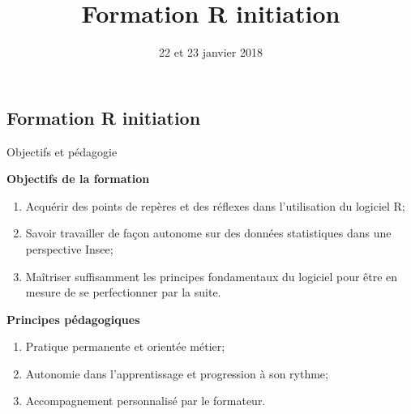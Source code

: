\documentclass[12pt,ignorenonframetext,]{beamer}
\institute{
	\texttt{[image: Logo\_Insee.png]} \\ ~ \\ 
	\normalsize Martin \textsc{Chevalier} (Insee)
}
\author{22 et 23 janvier 2018}
\date{}
\title{Formation R initiation}
\date{}
\newcommand{\strong}[1]{\textbf{\textcolor{redInsee}{#1}}}
\begin{document}
\frame{\titlepage}

\subsection*{Formation R initiation}\label{formation-r-initiation}

\begin{frame}{Objectifs et pédagogie}

\strong{Objectifs de la formation}

\begin{enumerate}
\def\labelenumi{\arabic{enumi}.}
\item
  \pause Acquérir des points de repères et des réflexes dans
  l'utilisation du logiciel R;
\item
  \pause Savoir travailler de façon autonome sur des données
  statistiques dans une perspective Insee;
\item
  \pause Maîtriser suffisamment les principes fondamentaux du logiciel
  pour être en mesure de se perfectionner par la suite.
\end{enumerate}

\bigskip \pause \strong{Principes pédagogiques}

\begin{enumerate}
\def\labelenumi{\arabic{enumi}.}
\item
  \pause Pratique permanente et orientée métier;
\item
  \pause Autonomie dans l'apprentissage et progression à son rythme;
\item
  \pause Accompagnement personnalisé par le formateur.
\end{enumerate}

\end{frame}
\end{document}
